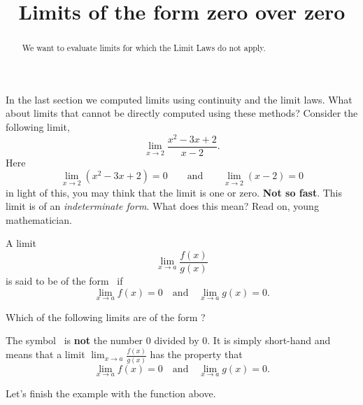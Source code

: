 \documentclass{ximera}
\title[Dig-In:]{Limits of the form zero over zero}
\begin{document}
\begin{abstract}
  We want to evaluate limits for which the Limit Laws do not apply. 
\end{abstract}

\maketitle

In the last section we computed  limits 
using continuity and the limit laws. What about limits that cannot be
directly computed using these methods?  Consider the following limit,
\[
\lim_{x\to 2}\frac{x^2-3x+2}{x-2}.
\]
Here 
\[
\lim_{x\to 2}\left(x^2-3x+2\right) = 0\qquad\text{and}\qquad \lim_{x\to
  2}\left(x-2\right) = 0
\]
in light of this, you may think that the limit is one or
zero. \textbf{Not so fast}. This limit is of an \textit{indeterminate
  form}. What does this mean? Read on, young mathematician.

\begin{definition}
  A limit
  \[
  \lim_{x\to a} \frac{f(x)}{g(x)}
  \]
  is said to be of the form \zeroOverZero\ if
  \[
  \lim_{x\to a} f(x) = 0\quad\text{and}\quad \lim_{x\to a} g(x) =0.
  \]
\end{definition}

\begin{question}
  Which of the following limits are of the form \zeroOverZero?
  \begin{selectAll}
  \end{selectAll}
\end{question}

\begin{warning}
  The symbol \zeroOverZero\ is \textbf{not} the number $0$ divided by
  $0$. It is simply short-hand and means that a limit $\lim_{x\to a}
  \frac{f(x)}{g(x)}$ has the property that
  \[
  \lim_{x\to a} f(x) = 0\quad\text{and}\quad \lim_{x\to a} g(x) =0.
  \]
\end{warning}


Let's finish the example with the function above.
\end{document}

